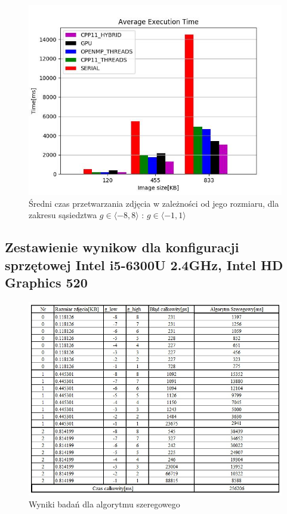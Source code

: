 \documentclass[document.tex]{subfiles}
\begin{document}
\clearpage
\begin{figure}[h]
\includegraphics[scale=0.8]{imgs/plot1_pc.jpg}
\caption{Średni czas przetwarzania zdjęcia w zależności od jego rozmiaru, dla zakresu sąsiedztwa $g\in \langle -8, 8 \rangle$ : $g\in \langle -1, 1 \rangle$}
\label{fig:results_pc_hybrid}
\end{figure}



\clearpage
\subsection{Zestawienie wynikow dla konfiguracji sprzętowej 
Intel i5-6300U 2.4GHz, Intel HD Graphics 520}

\begin{figure}[h]
\includegraphics[scale=0.75]{imgs/results_lap_serial}
\caption{Wyniki badań dla algorytmu szeregowego}
\label{fig:results_lap_serial}
\end{figure}
\end{document}

